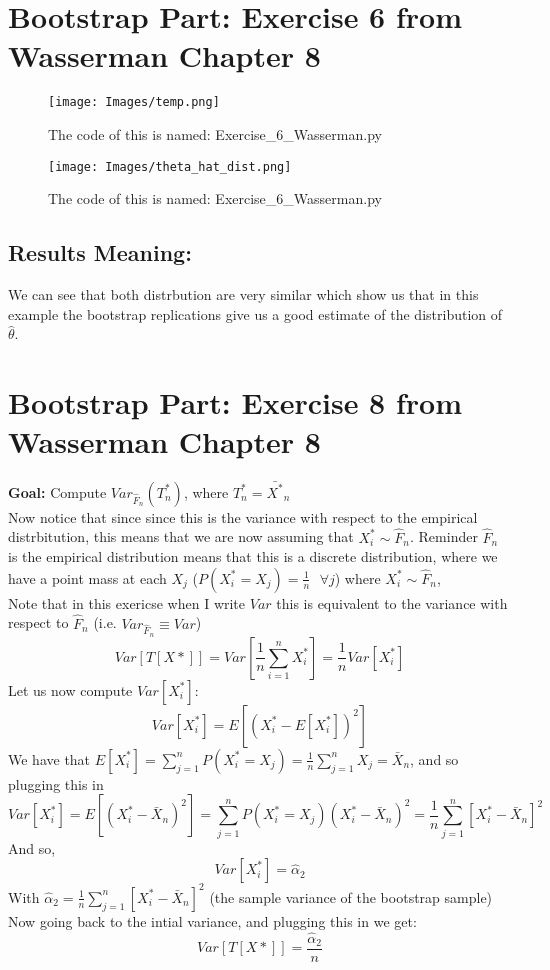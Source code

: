 \documentclass[12pt]{article}
\begin{document}
\section*{Bootstrap Part: Exercise 6 from Wasserman Chapter 8}
\begin{figure}[H]
  \centering
  \texttt{[image: Images/temp.png]}
  \caption{The code of this is named: Exercise\_6\_Wasserman.py}
\end{figure}
\begin{figure}[H]
  \centering
  \texttt{[image: Images/theta\_hat\_dist.png]}
  \caption{The code of this is named: Exercise\_6\_Wasserman.py}
\end{figure}
\subsection*{Results Meaning:}
We can see that both distrbution are very similar which show us that in this example the bootstrap replications give us a good estimate of the distribution of $\hat{\theta}$.
\section*{Bootstrap Part: Exercise 8 from Wasserman Chapter 8}
\textbf{Goal:} Compute $Var_{\hat{F}_n}(T_n^*)$, where $T_n^*= \bar{X^*}_n$ \\
Now notice that since since this is the variance with respect to the empirical distrbitution, this means that we are now assuming that $X_i^* \sim \hat{F}_n$. Reminder $\hat{F}_n$ is the empirical distribution means that this is a discrete distribution, where we have a point mass at each $X_j$ ($P(X_i^*=X_j) = \frac{1}{n} \ \ \ \forall j$) where $X_i^*\sim \hat{F}_n$,\\ Note that in this exericse when I write $Var$ this is equivalent to the variance with respect to $\hat{F}_n$ (i.e. $Var_{\hat{F}_n} \equiv Var$)\\
\[
Var[T[X*]] = Var[\frac{1}{n}\sum_{i=1}^{n}X_i^*] = \frac{1}{n}Var[X_i^*]
\]
Let us now compute $Var[X_i^*]$:
\[
Var[X_i^*] = E[(X_i^*-E[X_i^*])^2]
\]
We have that $E[X_i^*] = \sum_{j=1}^{n}P(X_i^*=X_j) = \frac{1}{n}\sum_{j=1}^{n}X_j = \bar{X}_n$, and so plugging this in 
\[
Var[X_i^*] = E[(X_i^*-\bar{X}_n)^2] = \sum_{j=1}^{n}P(X_i^*=X_j)(X_i^*-\bar{X}_n)^2 = \frac{1}{n} \sum_{j=1}^{n}[X_i^*-\bar{X}_n]^2
\]
And so, 
\[
  Var[X_i^*] = \hat{\alpha}_2
\]
With $\hat{\alpha}_2 = \frac{1}{n} \sum_{j=1}^{n}[X_i^*-\bar{X}_n]^2$ (the sample variance of the bootstrap sample)\\
Now going back to the intial variance, and plugging this in we get:
\[
Var[T[X*]] = \frac{\hat{\alpha}_2}{n} 
\]
\end{document}
